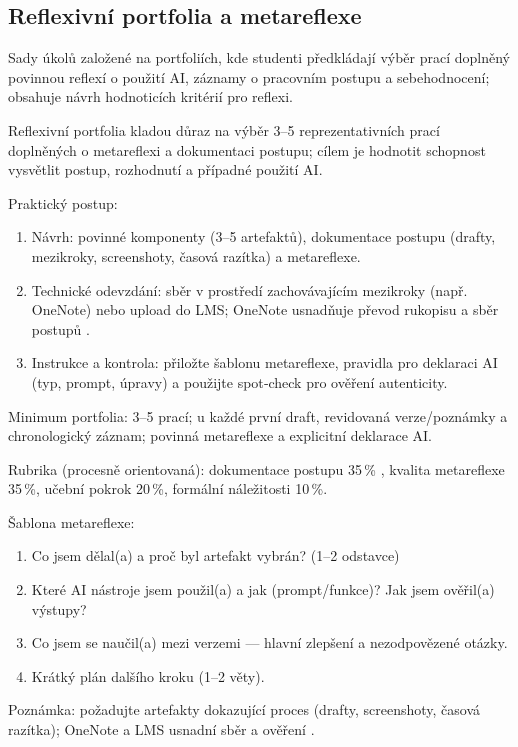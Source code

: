\documentclass{report}%
\begin{document}
%
\subsection{Reflexivní portfolia a metareflexe}%
Sady úkolů založené na portfoliích, kde studenti předkládají výběr prací doplněný povinnou reflexí o použití AI, záznamy o pracovním postupu a sebehodnocení; obsahuje návrh hodnoticích kritérií pro reflexi.%


%
Reflexivní portfolia kladou důraz na výběr 3--5 reprezentativních prací doplněných o metareflexi a dokumentaci postupu; cílem je hodnotit schopnost vysvětlit postup, rozhodnutí a případné použití AI.

Praktický postup: 
\begin{enumerate}
\item Návrh: povinné komponenty (3--5 artefaktů), dokumentace postupu (drafty, mezikroky, screenshoty, časová razítka) a metareflexe.
\item Technické odevzdání: sběr v prostředí zachovávajícím mezikroky (např. OneNote) nebo upload do LMS; OneNote usnadňuje převod rukopisu a sběr postupů \cite{kb_ai_101_tipu_pdf_04e4a115_page_8_1}.
\item Instrukce a kontrola: přiložte šablonu metareflexe, pravidla pro deklaraci AI (typ, prompt, úpravy) a použijte spot‑check pro ověření autenticity.
\end{enumerate}

Minimum portfolia: 3--5 prací; u každé první draft, revidovaná verze/poznámky a chronologický záznam; povinná metareflexe a explicitní deklarace AI.

Rubrika (procesně orientovaná): dokumentace postupu 35\,\% \cite{kb_ai_101_tipu_pdf_04e4a115_page_8_1}, kvalita metareflexe 35\,\%, učební pokrok 20\,\%, formální náležitosti 10\,\%.

Šablona metareflexe: 
\begin{enumerate}
\item Co jsem dělal(a) a proč byl artefakt vybrán? (1--2 odstavce) \item Které AI nástroje jsem použil(a) a jak (prompt/funkce)? Jak jsem ověřil(a) výstupy?
\item Co jsem se naučil(a) mezi verzemi — hlavní zlepšení a nezodpovězené otázky. \item Krátký plán dalšího kroku (1--2 věty).
\end{enumerate}

Poznámka: požadujte artefakty dokazující proces (drafty, screenshoty, časová razítka); OneNote a LMS usnadní sběr a ověření \cite{kb_ai_101_tipu_pdf_04e4a115_page_8_1}.%
\end{document}
